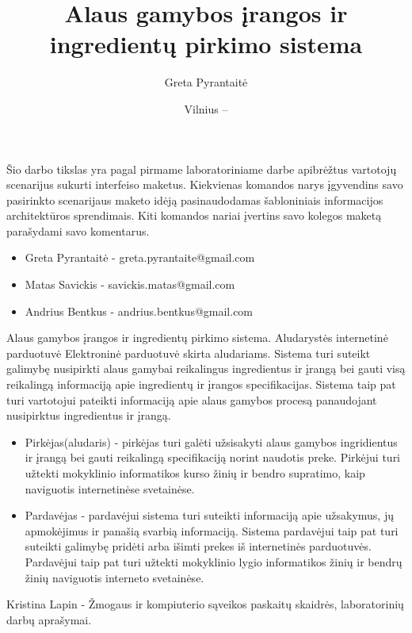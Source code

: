 \documentclass[oneside]{VUMIFPSkursinis}
\title{Alaus gamybos įrangos ir ingredientų pirkimo sistema}
\author{Greta Pyrantaitė}
\date{Vilnius – \the\year}
\begin{document}
\maketitle

Šio darbo tikslas yra pagal pirmame laboratoriniame darbe apibrėžtus vartotojų scenarijus sukurti interfeiso maketus.
Kiekvienas komandos narys įgyvendins savo pasirinkto scenarijaus maketo idėją pasinaudodamas šabloniniais informacijos architektūros sprendimais. 
Kiti komandos nariai įvertins savo kolegos maketą parašydami savo komentarus.

\begin{itemize}
	\item{Greta Pyrantaitė - greta.pyrantaite@gmail.com}
	\item{Matas Savickis - savickis.matas@gmail.com}
	\item{Andrius Bentkus - andrius.bentkus@gmail.com}
\end{itemize}

\tableofcontents

		Alaus gamybos įrangos ir ingredientų pirkimo sistema.
		Aludarystės internetinė parduotuvė
		Elektroninė parduotuvė skirta aludariams.
		Sistema turi suteikt galimybę nusipirkti alaus gamybai reikalingus ingredientus ir įrangą bei gauti visą reikalingą informaciją apie ingredientų ir įrangos specifikacijas.
		Sistema taip pat turi vartotojui pateikti informaciją apie alaus gamybos procesą panaudojant nusipirktus ingredientus ir įrangą.
		\begin{itemize}
			\item{Pirkėjas(aludaris) - pirkėjas turi galėti užsisakyti alaus gamybos ingridientus ir įrangą bei gauti reikalingą specifikaciją norint naudotis preke.
				Pirkėjui turi užtekti mokyklinio informatikos kurso žinių ir bendro supratimo, kaip naviguotis internetinėse svetainėse.}
			\item{Pardavėjas - pardavėjui sistema turi suteikti informaciją apie užsakymus, jų apmokėjimus ir panašią svarbią informaciją.
				Sistema pardavėjui taip pat turi suteikti galimybę pridėti arba išimti prekes iš internetinės parduotuvės.
				Pardavėjui taip pat turi užtekti mokyklinio lygio informatikos žinių ir bendrų žinių naviguotis interneto svetainėse.}
		\end{itemize}
		Kristina Lapin - Žmogaus ir kompiuterio sąveikos paskaitų skaidrės, laboratorinių darbų aprašymai.
\end{document}
